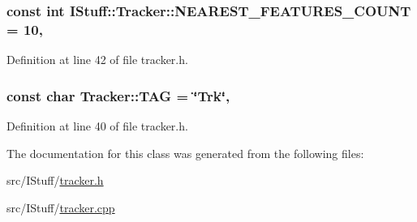 \hypertarget{class_i_stuff_1_1_tracker_a7bd424308b6879e92434378e653c8bdc}{
\subsubsection[{N\-E\-A\-R\-E\-S\-T\-\_\-\-F\-E\-A\-T\-U\-R\-E\-S\-\_\-\-C\-O\-U\-N\-T}]{\setlength{\rightskip}{0pt plus 5cm}const int I\-Stuff\-::\-Tracker\-::\-N\-E\-A\-R\-E\-S\-T\-\_\-\-F\-E\-A\-T\-U\-R\-E\-S\-\_\-\-C\-O\-U\-N\-T = 10\hspace{0.3cm}{\ttfamily [static]}, {\ttfamily [private]}}}\label{class_i_stuff_1_1_tracker_a7bd424308b6879e92434378e653c8bdc}


Definition at line 42 of file tracker.\-h.

\hypertarget{class_i_stuff_1_1_tracker_a68ef6bf09dbf9db7a6788ed899edb28d}{
\subsubsection[{T\-A\-G}]{\setlength{\rightskip}{0pt plus 5cm}const char Tracker\-::\-T\-A\-G = \char`\"{}Trk\char`\"{}\hspace{0.3cm}{\ttfamily [static]}, {\ttfamily [private]}}}\label{class_i_stuff_1_1_tracker_a68ef6bf09dbf9db7a6788ed899edb28d}


Definition at line 40 of file tracker.\-h.



The documentation for this class was generated from the following files\-:\begin{DoxyCompactItemize}
\item 
src/\-I\-Stuff/\hyperlink{tracker_8h}{tracker.\-h}\item 
src/\-I\-Stuff/\hyperlink{tracker_8cpp}{tracker.\-cpp}\end{DoxyCompactItemize}

